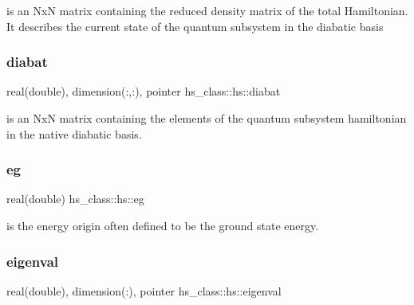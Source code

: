 is an NxN matrix containing the reduced density matrix of the total Hamiltonian. It describes the current state of the quantum subsystem in the diabatic basis 

\mbox{\label{strucths__class_1_1hs_a18f6eb65a6edae047d41c8aa5a3d9d09}} 
\subsubsection{\texorpdfstring{diabat}{diabat}}
{\footnotesize\ttfamily real(double), dimension(\+:,\+:), pointer hs\+\_\+class\+::hs\+::diabat\hspace{0.3cm}{\ttfamily [private]}}



is an NxN matrix containing the elements of the quantum subsystem hamiltonian in the native diabatic basis. 

\mbox{\label{strucths__class_1_1hs_aa0f4d851a33f1d195d2b6b9334cdb5d5}} 
\subsubsection{\texorpdfstring{eg}{eg}}
{\footnotesize\ttfamily real(double) hs\+\_\+class\+::hs\+::eg\hspace{0.3cm}{\ttfamily [private]}}



is the energy origin often defined to be the ground state energy. 

\mbox{\label{strucths__class_1_1hs_ae978013c998c123a7430209fa2797511}} 
\subsubsection{\texorpdfstring{eigenval}{eigenval}}
{\footnotesize\ttfamily real(double), dimension(\+:), pointer hs\+\_\+class\+::hs\+::eigenval\hspace{0.3cm}{\ttfamily [private]}}



